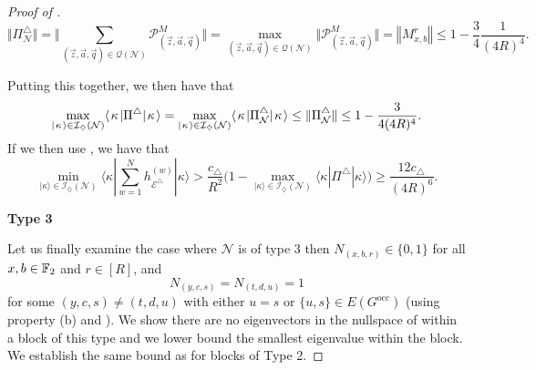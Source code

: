 \documentclass[../thesis-main/thesis-main]{subfiles}
\begin{document}
\begin{proof}[Proof of \protect{}]
\begin{equation}
  \big\Vert \Pi_{\mathcal{N}}^{\triangle}\big\Vert 
    =\Bigg\Vert \sum_{(\vec{z},\vec{a},\vec{q})\in\mathcal{Q}(\mathcal{N})}\mathcal{P}_{(\vec{z},\vec{a},\vec{q})}^{M}\Bigg\Vert 
    =\max_{(\vec{z},\vec{a},\vec{q})\in\mathcal{Q}(\mathcal{N})}\big\Vert \mathcal{P}_{(\vec{z},\vec{a},\vec{q})}^{M}\big\Vert 
    =\left\Vert M_{x,b}^{r}\right\Vert \leq1-\frac{3}{4}\frac{1}{\left(4R\right)^{4}}.
  \label{eq:bound_on_norm_pi_n_triangle}
\end{equation}

Putting this together, we then have that
\begin{equation}
  \max_{|\mspace{2mu} \kappa \mspace{2mu} \rangle\in \mathcal{I}_{\diamondsuit}(\mathcal{N})} \langle\mspace{2mu} \kappa \mspace{2mu} | \Pi^{\triangle} |\mspace{2mu} \kappa \mspace{2mu} \rangle = \max_{|\mspace{2mu} \kappa \mspace{2mu} \rangle\in \mathcal{I}_{\diamondsuit}(\mathcal{N})} \langle\mspace{2mu} \kappa \mspace{2mu} | \Pi^{\triangle}_{\mathcal{N}} |\mspace{2mu} \kappa \mspace{2mu} \rangle \leq \|{\Pi^{\triangle}_{\mathcal{N}}}\| \leq 1 - \frac{3}{4(4R)^4}.
\end{equation}
If we then use , we have that
\begin{equation}
  \min_{|\kappa\rangle\in\mathcal{I}_{\diamondsuit}(\mathcal{N})}\langle\kappa|\sum_{w=1}^{N}h_{\mathcal{E}^{\triangle}}^{(w)}|\kappa\rangle>\frac{c_{\triangle}}{R^{2}}\Big(1-\max_{|\kappa\rangle\in\mathcal{I}_{\diamondsuit}(\mathcal{N})}\langle\kappa|\Pi^{\triangle}|\kappa\rangle\Big) \geq \frac{12c_{\triangle}}{(4R)^6}.
\end{equation}

\medskip

\noindent \textbf{Type 3}

\smallskip

\noindent Let us finally examine the case where $\mathcal{N}$ is of type 3 then $N_{(x,b,r)}\in\{0,1\}$
for all $x,b\in\mathbb{F}_2$ and $r\in[R]$, and 
\begin{equation}
N_{(y,c,s)}=N_{(t,d,u)}=1
\end{equation}
for some $(y,c,s)\neq(t,d,u)$ with either $u=s$ or $\{u,s\}\in E(G^{\text{occ}})$ (using property (b) and ). We show there are no eigenvectors in the nullspace of  within a block of this type and we lower bound the smallest eigenvalue within the block. We establish the same bound  as for blocks of Type 2.


\end{proof}
\end{document}
